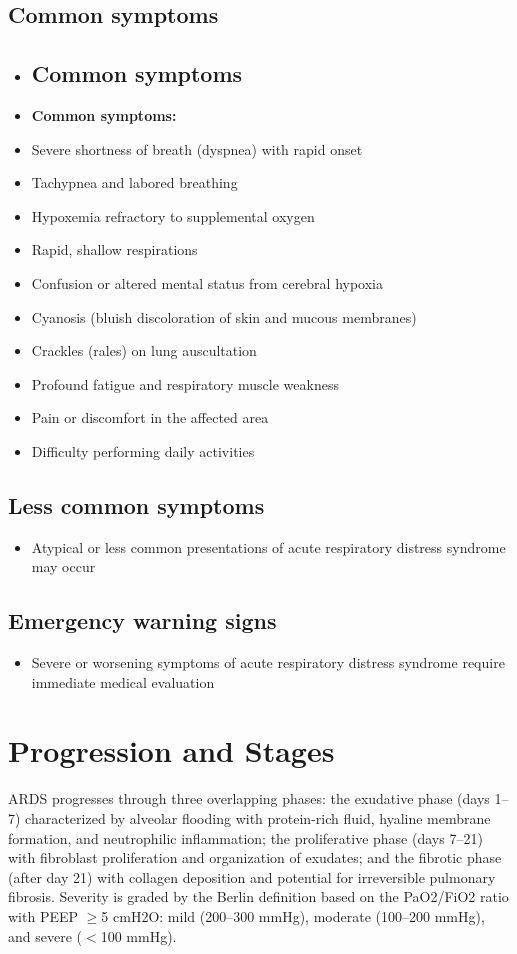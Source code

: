 \subsection{Common symptoms}
\begin{itemize}[noitemsep]
  \item \subsection{Common symptoms}
  \item \textbf{Common symptoms:}
  \item Severe shortness of breath (dyspnea) with rapid onset
  \item Tachypnea and labored breathing
  \item Hypoxemia refractory to supplemental oxygen
  \item Rapid, shallow respirations
  \item Confusion or altered mental status from cerebral hypoxia
  \item Cyanosis (bluish discoloration of skin and mucous membranes)
  \item Crackles (rales) on lung auscultation
  \item Profound fatigue and respiratory muscle weakness
  \item Pain or discomfort in the affected area
  \item Difficulty performing daily activities
\end{itemize}

\subsection{Less common symptoms}
\begin{itemize}[noitemsep]
  \item Atypical or less common presentations of acute respiratory distress syndrome may occur
\end{itemize}

\subsection{Emergency warning signs}
\begin{itemize}[noitemsep]
  \item Severe or worsening symptoms of acute respiratory distress syndrome require immediate medical evaluation
\end{itemize}
\section{Progression and Stages}
ARDS progresses through three overlapping phases: the exudative phase (days 1--7) characterized by alveolar flooding with protein-rich fluid, hyaline membrane formation, and neutrophilic inflammation; the proliferative phase (days 7--21) with fibroblast proliferation and organization of exudates; and the fibrotic phase (after day 21) with collagen deposition and potential for irreversible pulmonary fibrosis. Severity is graded by the Berlin definition based on the PaO2/FiO2 ratio with PEEP $\ge$5 cmH2O: mild (200--300 mmHg), moderate (100--200 mmHg), and severe ($<$100 mmHg).

